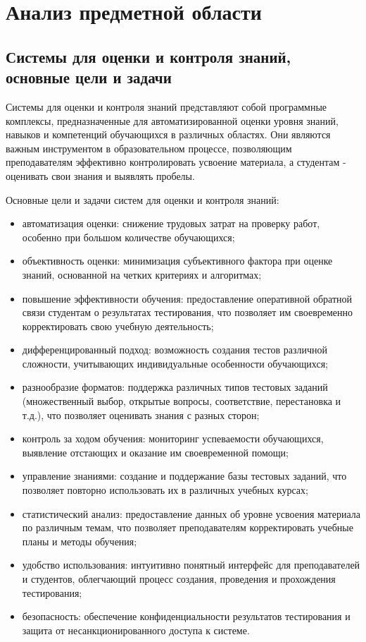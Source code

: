 \section{Анализ предметной области}
\subsection{Системы для оценки и контроля знаний, основные цели и задачи}

Системы для оценки и контроля знаний представляют собой программные комплексы, предназначенные для автоматизированной оценки уровня знаний, навыков и компетенций обучающихся в различных областях. Они являются важным инструментом в образовательном процессе, позволяющим преподавателям эффективно контролировать усвоение материала, а студентам - оценивать свои знания и выявлять пробелы.

Основные цели и задачи систем для оценки и контроля знаний:
\begin{itemize}
	\item автоматизация оценки: снижение трудовых затрат на проверку работ, особенно при большом количестве обучающихся;
	\item объективность оценки: минимизация субъективного фактора при оценке знаний, основанной на четких критериях и алгоритмах;
	\item повышение эффективности обучения: предоставление оперативной обратной связи студентам о результатах тестирования, что позволяет им своевременно корректировать свою учебную деятельность;
	\item дифференцированный подход: возможность создания тестов различной сложности, учитывающих индивидуальные особенности обучающихся;
	\item разнообразие форматов: поддержка различных типов тестовых заданий (множественный выбор, открытые вопросы, соответствие, перестановка и т.д.), что позволяет оценивать знания с разных сторон;
	\item контроль за ходом обучения: мониторинг успеваемости обучающихся, выявление отстающих и оказание им своевременной помощи;
	\item управление знаниями: создание и поддержание базы тестовых заданий, что позволяет повторно использовать их в различных учебных курсах;
	\item статистический анализ: предоставление данных об уровне усвоения материала по различным темам, что позволяет преподавателям корректировать учебные планы и методы обучения;
	\item удобство использования: интуитивно понятный интерфейс для преподавателей и студентов, облегчающий процесс создания, проведения и прохождения тестирования;
	\item безопасность: обеспечение конфиденциальности результатов тестирования и защита от несанкционированного доступа к системе.
\end{itemize}

